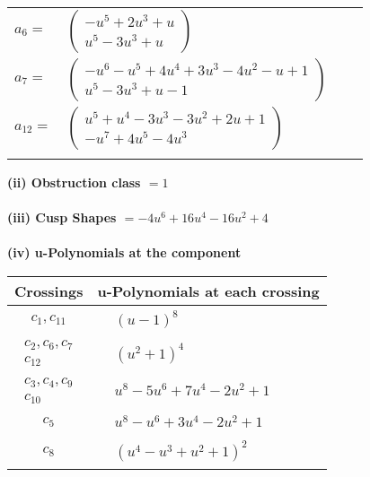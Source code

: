 \documentclass[1p]{elsarticle_modified}
\theoremstyle{definition}
\begin{document}
\begin{tabular}{m{7pt} m{180pt} m{7pt} m{180pt} }
\flushright $a_{6}=$&$\begin{pmatrix}- u^5+2 u^3+u\\u^5-3 u^3+u\end{pmatrix}$ \\
\flushright $a_{7}=$&$\begin{pmatrix}- u^6- u^5+4 u^4+3 u^3-4 u^2- u+1\\u^5-3 u^3+u-1\end{pmatrix}$ \\
\flushright $a_{12}=$&$\begin{pmatrix}u^5+u^4-3 u^3-3 u^2+2 u+1\\- u^7+4 u^5-4 u^3\end{pmatrix}$\\&\end{tabular}
\flushleft \textbf{(ii) Obstruction class $= 1$}\\~\\
\flushleft \textbf{(iii) Cusp Shapes $= -4 u^6+16 u^4-16 u^2+4$}\\~\\
\newpage\renewcommand{\arraystretch}{1}
\flushleft \textbf{(iv) u-Polynomials at the component}\newline \\
\begin{tabular}{m{50pt}|m{274pt}}
Crossings & \hspace{64pt}u-Polynomials at each crossing \\
\hline $$\begin{aligned}c_{1},c_{11}\end{aligned}$$&$\begin{aligned}
&(u-1)^8
\end{aligned}$\\
\hline $$\begin{aligned}c_{2},c_{6},c_{7}\\c_{12}\end{aligned}$$&$\begin{aligned}
&(u^2+1)^4
\end{aligned}$\\
\hline $$\begin{aligned}c_{3},c_{4},c_{9}\\c_{10}\end{aligned}$$&$\begin{aligned}
&u^8-5 u^6+7 u^4-2 u^2+1
\end{aligned}$\\
\hline $$\begin{aligned}c_{5}\end{aligned}$$&$\begin{aligned}
&u^8- u^6+3 u^4-2 u^2+1
\end{aligned}$\\
\hline $$\begin{aligned}c_{8}\end{aligned}$$&$\begin{aligned}
&(u^4- u^3+u^2+1)^2
\end{aligned}$\\
\hline
\end{tabular}\\~\\
\end{document}
